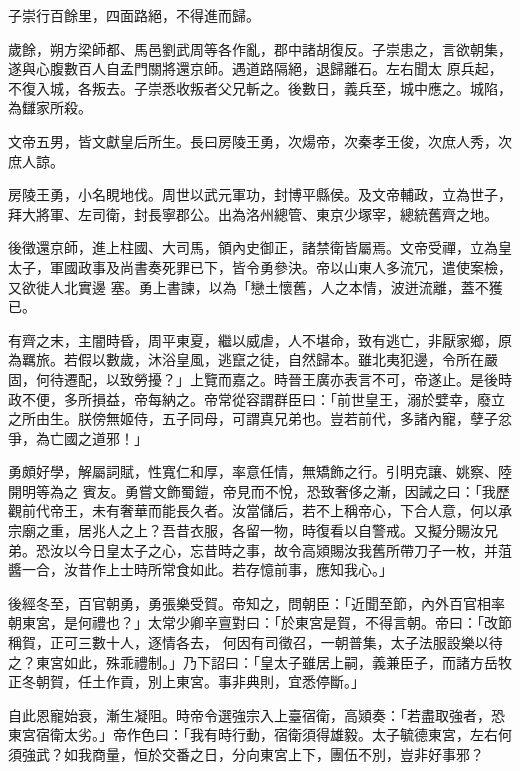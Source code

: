 \begin{pinyinscope}
 子崇行百餘里，四面路絕，不得進而歸。



 歲餘，朔方梁師都、馬邑劉武周等各作亂，郡中諸胡復反。子崇患之，言欲朝集，遂與心腹數百人自孟門關將還京師。遇道路隔絕，退歸離石。左右聞太
 原兵起，不復入城，各叛去。子崇悉收叛者父兄斬之。後數日，義兵至，城中應之。城陷，為讎家所殺。



 文帝五男，皆文獻皇后所生。長曰房陵王勇，次煬帝，次秦孝王俊，次庶人秀，次庶人諒。



 房陵王勇，小名睍地伐。周世以武元軍功，封博平縣侯。及文帝輔政，立為世子，拜大將軍、左司衛，封長寧郡公。出為洛州總管、東京少塚宰，總統舊齊之地。



 後徵還京師，進上柱國、大司馬，領內史御正，諸禁衛皆屬焉。文帝受禪，立為皇太子，軍國政事及尚書奏死罪已下，皆令勇參決。帝以山東人多流冗，遣使案檢，又欲徙人北實邊
 塞。勇上書諫，以為「戀土懷舊，人之本情，波迸流離，蓋不獲已。



 有齊之末，主闇時昏，周平東夏，繼以威虐，人不堪命，致有逃亡，非厭家鄉，原為羈旅。若假以數歲，沐浴皇風，逃竄之徒，自然歸本。雖北夷犯邊，令所在嚴固，何待遷配，以致勞擾？」上覽而嘉之。時晉王廣亦表言不可，帝遂止。是後時政不便，多所損益，帝每納之。帝常從容謂群臣曰：「前世皇王，溺於嬖幸，廢立之所由生。朕傍無姬侍，五子同母，可謂真兄弟也。豈若前代，多諸內寵，孽子忿爭，為亡國之道邪！」



 勇頗好學，解屬詞賦，性寬仁和厚，率意任情，無矯飾之行。引明克讓、姚察、陸開明等為之
 賓友。勇嘗文飾蜀鎧，帝見而不悅，恐致奢侈之漸，因誡之曰：「我歷觀前代帝王，未有奢華而能長久者。汝當儲后，若不上稱帝心，下合人意，何以承宗廟之重，居兆人之上？吾昔衣服，各留一物，時復看以自警戒。又擬分賜汝兄弟。恐汝以今日皇太子之心，忘昔時之事，故令高熲賜汝我舊所帶刀子一枚，并菹醬一合，汝昔作上士時所常食如此。若存憶前事，應知我心。」



 後經冬至，百官朝勇，勇張樂受賀。帝知之，問朝臣：「近聞至節，內外百官相率朝東宮，是何禮也？」太常少卿辛亶對曰：「於東宮是賀，不得言朝。帝曰：「改節稱賀，正可三數十人，逐情各去，
 何因有司徵召，一朝普集，太子法服設樂以待之？東宮如此，殊乖禮制。」乃下詔曰：「皇太子雖居上嗣，義兼臣子，而諸方岳牧正冬朝賀，任土作貢，別上東宮。事非典則，宜悉停斷。」



 自此恩寵始衰，漸生凝阻。時帝令選強宗入上臺宿衛，高熲奏：「若盡取強者，恐東宮宿衛太劣。」帝作色曰：「我有時行動，宿衛須得雄毅。太子毓德東宮，左右何須強武？如我商量，恒於交番之日，分向東宮上下，團伍不別，豈非好事邪？




\end{pinyinscope}
